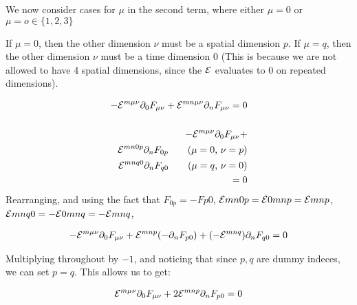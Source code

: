 We now consider cases for $\mu$ in the second term, where either $\mu = 0$ or $\mu = o \in \{1, 2, 3\}$

If $\mu = 0$, then the other dimension $\nu$ must be a spatial dimension $p$.
If $\mu = q$, then the other dimension $\nu$ must be a time dimension $0$
(This is because we are not allowed to have 4 spatial dimensions, since the $\mathcal{E}$
evaluates to 0 on repeated dimensions).


\begin{align*}
    - \mathcal{E}^{m \mu \nu}  \partial_{0} F_{\mu \nu} + \mathcal{E}^{m n \mu \nu}  \partial_{n} F_{\mu \nu}  = 0 \\
    \\
    - \mathcal{E}^{m \mu \nu}  \partial_{0} F_{\mu \nu} + \\
    \mathcal{E}^{m n 0 p}  \partial_{n} F_{0 p}  \tag{$\mu = 0$, $\nu = p$} \\
    \mathcal{E}^{m n q 0}  \partial_{n} F_{q 0} \tag{$\mu = q$, $\nu = 0$} \\
    = 0 
\end{align*}
Rearranging, and using the fact that $F_{0 p} = - F {p 0}$,
$\mathcal{E}{m n 0 p} = \mathcal{E}{0 m n p} = \mathcal{E}{m n p}$,
$\mathcal{E}{m n q 0} = - \mathcal{E}{0 m n q} = - \mathcal{E}{m n q}$,

\begin{align*}
    - \mathcal{E}^{m \mu \nu}  \partial_{0} F_{\mu \nu} + 
    \mathcal{E}^{m n p}  (- \partial_{n} F_{p 0}) +
    (- \mathcal{E}^{m n q})  \partial_{n} F_{q 0}
    = 0 
\end{align*}

Multiplying throughout by $-1$, and noticing that since $p, q$ are dummy indeces,
we can set $p = q$. This allows us to get:



\begin{align*}
    \mathcal{E}^{m \mu \nu}  \partial_{0} F_{\mu \nu} + 
    2 \mathcal{E}^{m n p}   \partial_{n} F_{p 0} = 0
\end{align*}
